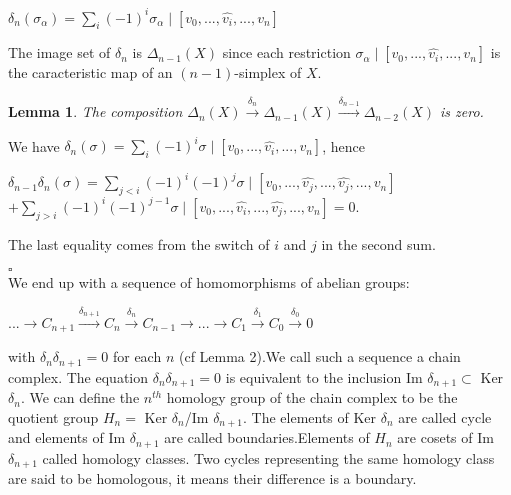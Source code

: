 \documentclass[12pt]{article}
\newtheorem{lemma}{Lemma}
\newenvironment{proof}{{\sc Proof:}}{\hfill $\square$}
\begin{document}
\begin{center}

  $\delta_n(\sigma_\alpha) = \sum_i (-1)^i \sigma_\alpha \mid [v_0 , ... , \hat{v_i} , ... , v_n]$

\end{center}

The image set of $\delta_n$ is $\Delta_{n-1} (X)$ since each restriction $\sigma_\alpha \mid [v_0 , ... , \hat{v_i} , ... , v_n]$ is the caracteristic map of an $(n-1)$-simplex of $X$.\\

\begin{lemma}

  The composition $\Delta_n (X) \xrightarrow{\delta_n} \Delta_{n-1} (X) \xrightarrow{\delta_{n-1}} \Delta_{n-2} (X)$ is zero.

\end{lemma}

\begin{proof}

  We have $\delta_n(\sigma) = \sum_i (-1)^i \sigma \mid [v_0, ... , \hat{v_i} , ... , v_n] $, hence \\
  \vspace{-10pt}
  \begin{center}
  $\delta_{n-1}\delta_n (\sigma) = \sum\limits_{j < i} (-1)^i (-1)^j \sigma \mid [v_0, ... , \hat{v_j} , ... , \hat{v_j} , ... , v_n]$
  \sv
$+ \sum\limits_{j > i} (-1)^i (-1)^{j-1} \sigma \mid [v_0, ... , \hat{v_i}, ... , \hat{v_j} , ... , v_n] = 0$.
\end{center}

  The last equality comes from the switch of $i$ and $j$ in the second sum.

\end{proof}
\\

We end up with a sequence of homomorphisms of abelian groups:\\

\begin{center}
  $... \to C_{n+1} \xrightarrow{\delta_{n+1}} C_n \xrightarrow{\delta_n} C_{n-1} \to ... \to C_1 \xrightarrow{\delta_1} C_0 \xrightarrow{\delta_0} 0$
\end{center}

with $\delta_n\delta_{n+1} = 0$ for each $n$ (cf Lemma 2).We call such a sequence a chain complex. The equation $\delta_n \delta_{n+1} = 0$ is equivalent to the inclusion Im $\delta_{n+1} \subset$ Ker $\delta_n$. We can define the $n^{th}$ homology group of the chain complex to be the quotient group $H_n =$ Ker $\delta_n$/Im $\delta_{n+1}$. The elements of Ker $\delta_n$ are called cycle and elements of Im $\delta_{n+1}$ are called boundaries.Elements of $H_n$ are cosets of Im $\delta_{n+1}$ called homology classes. Two cycles representing the same homology class are said to be homologous, it means their difference is a boundary.\\
\end{document}
